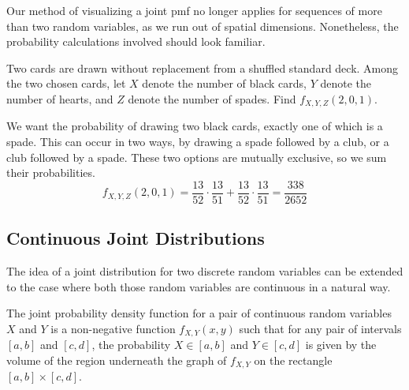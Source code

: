 \par
Our method of visualizing a joint pmf no longer applies for sequences of more than two random variables, as we run out of spatial dimensions. Nonetheless, the probability calculations involved should look familiar.
\begin{example}
Two cards are drawn without replacement from a shuffled standard deck. Among the two chosen cards, let $X$ denote the number of black cards, $Y$ denote the number of hearts, and $Z$ denote the number of spades. Find $f_{X,Y,Z}(2,0,1)$.
\par
\noindent We want the probability of drawing two black cards, exactly one of which is a spade. This can occur in two ways, by drawing a spade followed by a club, or a club followed by a spade. These two options are mutually exclusive, so we sum their probabilities.
$$f_{X,Y,Z}(2,0,1) = \frac{13}{52} \cdot \frac{13}{51} + \frac{13}{52} \cdot \frac{13}{51} = \frac{338}{2652}$$
\end{example}

\subsection*{Continuous Joint Distributions}

The idea of a joint distribution for two discrete random variables can be extended to the case where both those random variables are continuous in a natural way. 
\par
The joint probability density function for a pair of continuous random variables $X$ and $Y$ is a non-negative function $f_{X,Y}(x,y)$ such that for any pair of intervals $[a,b]$ and $[c,d]$, the probability $X \in [a,b]$ and $Y \in [c,d]$ is given by the volume of the region underneath the graph of $f_{X,Y}$ on the rectangle $[a,b] \times [c,d]$.

